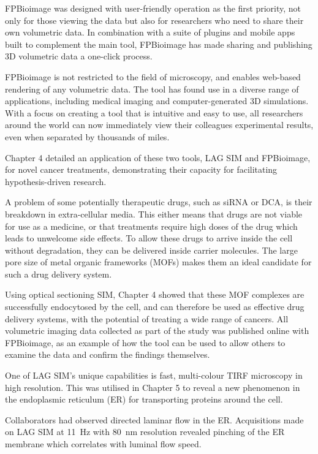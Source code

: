 FPBioimage was designed with user-friendly operation as the first priority, not only for those viewing the data but also for researchers who need to share their own volumetric data. 
In combination with a suite of plugins and mobile apps built to complement the main tool, FPBioimage has made sharing and publishing 3D volumetric data a one-click process.  

FPBioimage is not restricted to the field of microscopy, and enables 
web-based rendering of any volumetric data. 
The tool has found use in a diverse range of applications, including medical imaging and computer-generated 3D simulations. 
With a focus on creating a tool that is intuitive and easy to use, all researchers around the world can now immediately view their colleagues experimental results, even when separated by thousands of miles. 

Chapter 4 detailed an application of these two tools, LAG SIM and FPBioimage, for novel cancer treatments, demonstrating their capacity for facilitating hypothesis-driven research. 

A problem of some potentially therapeutic drugs, such as siRNA or DCA, is their breakdown in extra-cellular media. 
This either means that drugs are not viable for use as a medicine, or that treatments require high doses of the drug which leads to unwelcome side effects. 
To allow these drugs to arrive inside the cell without degradation, they can be delivered inside carrier molecules. 
The large pore size of metal organic frameworks (MOFs) makes them an ideal candidate for such a drug delivery system. 

Using optical sectioning SIM, Chapter 4 showed that these MOF complexes are successfully endocytosed by the cell, and can therefore be used as effective drug delivery systems, with the potential of treating a wide range of cancers. 
All volumetric imaging data collected as part of the study was published online with FPBioimage, as an example of how the tool can be used to allow others to examine the data and confirm the findings themselves. 

One of LAG SIM's unique capabilities is fast, multi-colour TIRF microscopy in high resolution. 
This was utilised in Chapter 5 to reveal a new phenomenon in the endoplasmic reticulum (ER) for transporting proteins around the cell. 

Collaborators had observed directed laminar flow in the ER.
Acquisitions made on LAG SIM at \SI{11}{\hertz} with \SI{80}{\nano\metre} resolution revealed pinching of the ER membrane which correlates with luminal flow speed. 

